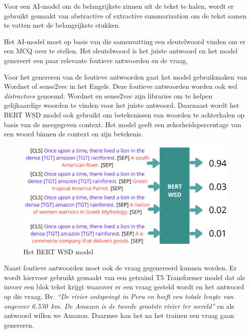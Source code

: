 Voor een AI-model om de belangrijkste zinnen uit de tekst te halen, wordt er gebruikt gemaakt van abstractive of extractive summarization om de tekst samen te vatten met de belangrijkste stukken.

Het AI-model moet op basis van die samenvatting een sleutelwoord vinden om er een MCQ over te stellen. Het sleutelwoord is het juiste antwoord en het model genereert een paar relevante foutieve antwoorden en de vraag.

Voor het genereren van de foutieve antwoorden gaat het model gebruikmaken van Wordnet of sense2vec in het Engels. Deze foutieve antwoorden worden ook wel \emph{distractors} genoemd. Wordnet en sense2vec zijn libraries om te helpen gelijkaardige woorden te vinden voor het juiste antwoord. Daarnaast wordt het BERT WSD model ook gebruikt om betekenissen van woorden te achterhalen op basis van de meegegeven context. Het model geeft een zekerheidspercentage van een woord binnen de context en zijn betekenis.

\begin{figure}[h]
    \centering
    \includegraphics[scale=0.6]{img/bert_wsd.png}
    \caption{Het BERT WSD model}
\end{figure}

Naast foutieve antwoorden moet ook de vraag gegenereerd kunnen worden. Er wordt hiervoor gebruikt gemaakt van een getraind T5 Transformer model dat als invoer een blok tekst krijgt waarover er een vraag gesteld wordt en het antwoord op die vraag. Bv. \emph{“De rivier ontspringt in Peru en heeft een totale lengte van ongeveer 6.530 km. De Amazon is de tweede grootste rivier ter wereld”} en als antwoord willen we Amazon. Daarmee kan het na het trainen een vraag gaan genereren.


